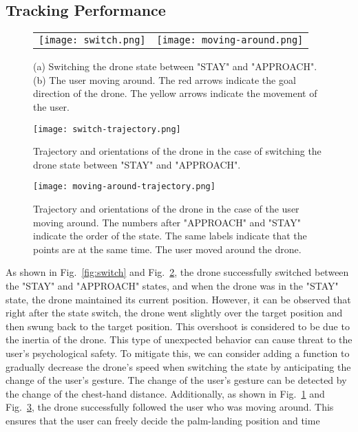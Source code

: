 \subsection{Tracking Performance}
\begin{figure}[!b]
  \centering
  \begin{tabular}{cc}
      \begin{minipage}[t]{0.35 \columnwidth}
        \centering
        \texttt{[image: switch.png]}
        \subcaption{}
        \label{fig:switch}
      \end{minipage} &
      \begin{minipage}[t]{0.45 \columnwidth}
        \centering
        \texttt{[image: moving-around.png]}
        \subcaption{}
        \label{fig:moving-around}
      \end{minipage}
    \end{tabular}
  \caption{(a) Switching the drone state between "STAY" and "APPROACH". (b) The user moving around. 
  The red arrows indicate the goal direction of the drone. The yellow arrows indicate the movement of the user.}
\end{figure}
\begin{figure}[!b]
  \centering
  \texttt{[image: switch-trajectory.png]}
  \caption{Trajectory and orientations of the drone in the case of switching the drone state between "STAY" and "APPROACH".}
  \label{fig:switch-trajectory}
\end{figure}
\begin{figure}[!b]
  \centering
  \texttt{[image: moving-around-trajectory.png]}
  \caption{Trajectory and orientations of the drone in the case of the user moving around. 
  The numbers after "APPROACH" and "STAY" indicate the order of the state. 
  The same labels indicate that the points are at the same time. 
  The user moved around the drone.}
  \label{fig:moving-trajectory}
\end{figure}
As shown in Fig.~\ref{fig:switch} and Fig.~\ref{fig:switch-trajectory}, the drone successfully switched between the "STAY" and "APPROACH" states,
and when the drone was in the "STAY" state, the drone maintained its current position.
However, it can be observed that right after the state switch, the drone went slightly over the target position and then swung back to the target position.
This overshoot is considered to be due to the inertia of the drone.
This type of unexpected behavior can cause threat to the user's psychological safety.
To mitigate this, we can consider adding a function to gradually decrease the drone's speed when switching the state by anticipating the change of the user's gesture.
The change of the user's gesture can be detected by the change of the chest-hand distance.
Additionally, as shown in Fig.~\ref{fig:moving-around} and Fig.~\ref{fig:moving-trajectory}, the drone successfully followed the user who was moving around.
This ensures that the user can freely decide the palm-landing position and time